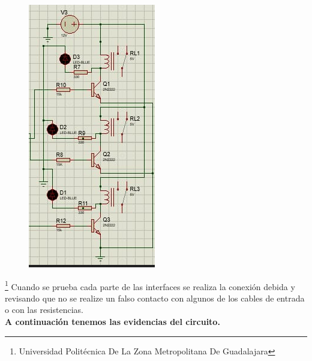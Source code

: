 \documentclass[11pt,a4paper]{article}
\begin{document}
\begin{figure}[hbtp]
\centering
\includegraphics[scale=0.60]{salida.png} 
\end{figure}

\footnote{Universidad Politécnica De La Zona Metropolitana De Guadalajara}
\newpage
Cuando se prueba cada parte de las interfaces se realiza la conexión debida y revisando que no se realize un falso contacto con algunos de los cables de entrada o con las resistencias.\\ \textbf{A continuación tenemos las evidencias del circuito.}
\end{document}
